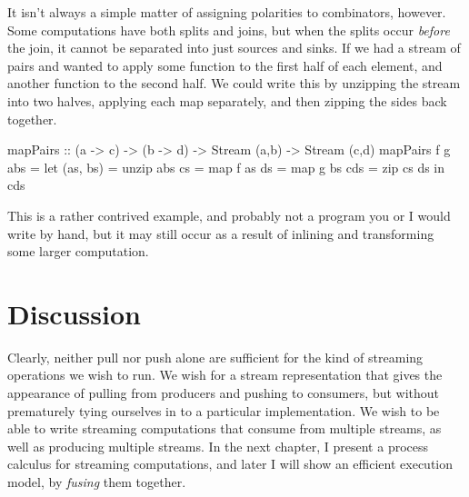 It isn't always a simple matter of assigning polarities to combinators, however.
Some computations have both splits and joins, but when the splits occur \emph{before} the join, it cannot be separated into just sources and sinks.
If we had a stream of pairs and wanted to apply some function to the first half of each element, and another function to the second half.
We could write this by unzipping the stream into two halves, applying each map separately, and then zipping the sides back together.
\begin{code}
mapPairs :: (a -> c) -> (b -> d) -> Stream (a,b) -> Stream (c,d)
mapPairs f g abs
 = let (as, bs) = unzip abs
       cs       = map f as
       ds       = map g bs
       cds      = zip cs ds
   in  cds
\end{code}

This is a rather contrived example, and probably not a program you or I would write by hand, but it may still occur as a result of inlining and transforming some larger computation.

\section{Discussion}

Clearly, neither pull nor push alone are sufficient for the kind of streaming operations we wish to run.
We wish for a stream representation that gives the appearance of pulling from producers and pushing to consumers, but without prematurely tying ourselves in to a particular implementation.
We wish to be able to write streaming computations that consume from multiple streams, as well as producing multiple streams.
In the next chapter, I present a process calculus for streaming computations, and later I will show an efficient execution model, by \emph{fusing} them together.

